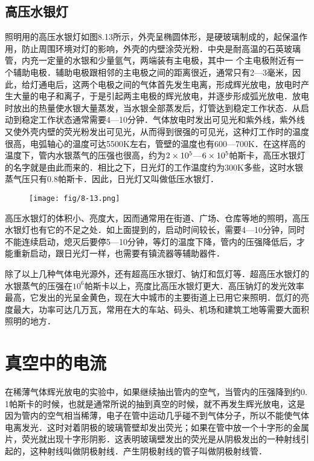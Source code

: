 \subsection{高压水银灯}

照明用的高压水银灯如图8.13所示，外壳呈椭圆体形，是硬玻璃制成的，起保温作用，防止周围环境对灯的影响，外壳的内壁涂荧光粉．中央是耐高温的石英玻璃管，内充一定量的水银和少量氩气，两端装有主电极，其中一
个主电极附近有一个辅助电极．辅助电极跟相邻的主电极之间的距离很近，通常只有2—3毫米，因此，给灯通电后，这两个电极之间的气体首先发生电离，形成辉光放电，放电时产生大量的电子和离子，于是引起两主电极的辉光放电，并逐步形成弧光放电．放电时放出的热量使水银大量蒸发，当水银全部蒸发后，灯管达到稳定工作状态．从启动到稳定工作状态通常需要4—10分钟．气体放电时发出可见光和紫外线，紫外线又使外壳内壁的荧光粉发出可见光，从而得到很强的可见光，这种灯工作时的温度很高，电弧轴心的温度可达5500K左右，管壁的温度也有600—700K．在这样高的温度下，管内水银蒸气的压强也很高，约为$2\times10^5$—$6\times10^5$帕斯卡，高压水银灯的名字就是由此而来的．相比之下，日光灯的工作温度约为300K多些，这时水银蒸气压只有0.8帕斯卡．因此，日光灯又叫做低压水银灯．
\begin{figure}[htp]\centering
    \texttt{[image: fig/8-13.png]}
    \caption{}
    \end{figure}

高压水银灯的体积小、亮度大，因而通常用在街道、广场、仓库等地的照明，高压水银灯也有它的不足之处．如上面提到的，启动时间较长，需要4—10分钟，同时不能连续启动，熄灭后要停5—10分钟，等灯的温度下降，管内的压强降低后，才能重新启动，跟日光灯一样，也需要有镇流器等辅助器件．

除了以上几种气体电光源外，还有超高压水银灯、钠灯和氙灯等．超高压水银灯的水银蒸气的压强在$10^6$帕斯卡以上，亮度比高压水银灯更大．高压钠灯的发光效率最高，它发出的光呈金黄色，现在大中城市的主要街道上已用它来照明．氙灯的亮度最大，功率可达几万瓦，常用在大的车站、码头、机场和建筑工地等需要大面积照明的地方．

\section{真空中的电流}

在稀薄气体辉光放电的实验中，如果继续抽出管内的空气，当管内的压强降到约0. 1帕斯卡的时候，也就是通常所说的抽到真空的时候，就不再发生辉光放电，这是因为管内的空气相当稀薄，电子在管中运动几乎碰不到气体分子，所以不能使气体电离发光．这时对着阴极的玻璃管壁却发出荧光；如果在管中放一个十字形的金属片，荧光就出现十字形阴影．这表明玻璃壁发出的荧光是从阴极发出的一种射线引起的，这种射线叫做阴极射线．产生阴极射线的管子叫做阴极射线管．

